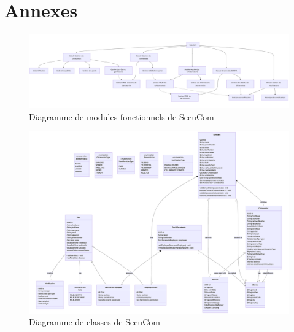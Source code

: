\chapter*{Annexes}
\thispagestyle{plain}
\clearpage

\begin{landscape}
\thispagestyle{empty}
\begin{figure}[p]
\centering
\includegraphics[width=0.85\paperheight,height=0.8\paperwidth,keepaspectratio]{ComposantsDiagram.png}
\caption{Diagramme de modules fonctionnels de SecuCom}
\end{figure}
\end{landscape}

\begin{landscape}
\thispagestyle{empty}
\begin{figure}[p]
\vspace*{-1cm}
\centering
\includegraphics[width=0.9\paperheight,height=0.85\paperwidth,keepaspectratio]{ClassDiagram.png}
\caption{Diagramme de classes de SecuCom}
\vspace*{1cm}
\end{figure}
\end{landscape}

